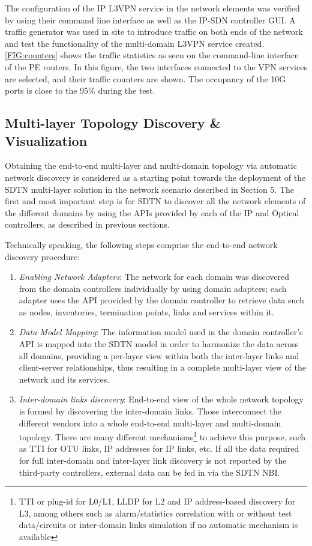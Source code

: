 \documentclass[a4paper,fleqn]{cas-dc}
\begin{document}
The configuration of the IP L3VPN service in the network elements was verified by using their command line interface as well as the IP-SDN controller GUI. A traffic generator was used in site to introduce traffic on both ends of the network and test the functionality of the multi-domain L3VPN service created.\cref{FIG:counters} shows the traffic statistics as seen on the command-line interface of the PE routers. In this figure, the two interfaces connected to the VPN services are selected, and their traffic counters are shown. The occupancy of the 10G ports is close to the 95\% during the test. 

\subsection{Multi-layer Topology Discovery \& Visualization}
Obtaining the end-to-end multi-layer and multi-domain topology via automatic network discovery is considered as a starting point towards the deployment of the SDTN multi-layer solution in the network scenario described in Section 5. The first and most important step is for SDTN to discover all the network elements of the different domains by using the APIs provided by each of the IP and Optical controllers, as described in previous sections. 

Technically speaking, the following steps comprise the end-to-end network discovery procedure:
\begin{enumerate}
    \item \textit{Enabling Network Adapters}: The network for each domain was discovered from the domain controllers individually by using domain adapters; each adapter uses the API provided by the domain controller to retrieve data such as nodes, inventories, termination points, links and services within it.
    \item \textit{Data Model Mapping}: The information model used in the domain controller's API is mapped into the SDTN model in order to harmonize the data across all domains, providing a per-layer view within both the inter-layer links and client-server relationships, thus resulting in a complete multi-layer view of the network and its services.
    \item \textit{Inter-domain links discovery}: End-to-end view of the whole network topology is formed by discovering the inter-domain links. Those interconnect the different vendors into a whole end-to-end multi-layer and multi-domain topology. There are many different mechanisms\footnote{TTI or plug-id for L0/L1, LLDP for L2 and IP address-based discovery for L3, among others such as alarm/statistics correlation with or without test data/circuits or inter-domain links simulation if no automatic mechanism is available} to achieve this purpose, such as TTI for OTU links, IP addresses for IP links, etc. If all the data required for full inter-domain and inter-layer link discovery is not reported by the third-party controllers, external data can be fed in via the SDTN NBI. 
\end{enumerate}
\end{document}
